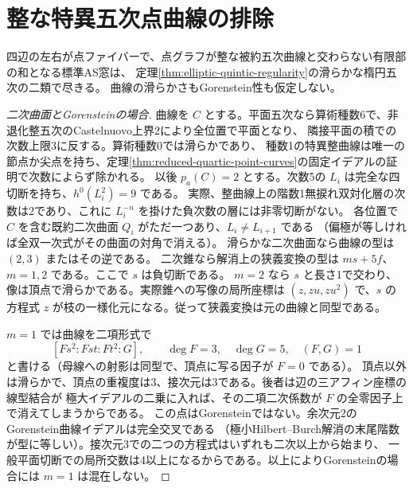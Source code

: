 \section{整な特異五次点曲線の排除}
\label{sec:singular-integral-quintic-exclusion}
\begin{theorem}\label{thm:singular-integral-quintic-exclusion}
四辺の左右が点ファイバーで、点グラフが整な被約五次曲線と交わらない有限部の和となる標準AS窓は、
定理\ref{thm:elliptic-quintic-regularity}の滑らかな楕円五次の二類で尽きる。
曲線の滑らかさもGorenstein性も仮定しない。
\end{theorem}
\begin{proof}[二次曲面とGorensteinの場合]
曲線を $C$ とする。平面五次なら算術種数6で、非退化整五次のCastelnuovo上界2により全位置で平面となり、
隣接平面の積での次数上限3に反する。算術種数0では滑らかであり、
種数1の特異整曲線は唯一の節点か尖点を持ち、定理\ref{thm:reduced-quartic-point-curves}の固定イデアルの証明で次数によらず除かれる。
以後 $p_a(C)=2$ とする。次数5の $L_i$ は完全な四切断を持ち、$h^0(L_i^2)=9$ である。
実際、整曲線上の階数1無捩れ双対化層の次数は2であり、これに $L_i^{-n}$ を掛けた負次数の層には非零切断がない。
各位置で $C$ を含む既約二次曲面 $Q_i$ がただ一つあり、$L_i\ne L_{i+1}$ である
（偏極が等しければ全双一次式がその曲面の対角で消える）。
滑らかな二次曲面なら曲線の型は $(2,3)$ またはその逆である。
二次錐なら解消上の狭義変換の型は $m s+5f$、$m=1,2$ である。ここで $s$ は負切断である。
$m=2$ なら $s$ と長さ1で交わり、像は頂点で滑らかである。実際錐への写像の局所座標は
$(z,zu,zu^2)$ で、$s$ の方程式 $z$ が枝の一様化元になる。従って狭義変換は元の曲線と同型である。

$m=1$ では曲線を二項形式で
\[
 [Fs^2:Fst:Ft^2:G],\qquad \deg F=3,\quad\deg G=5,\quad (F,G)=1
\]
と書ける（母線への射影は同型で、頂点に写る因子が $F=0$ である）。
頂点以外は滑らかで、頂点の重複度は3、接次元は3である。後者は辺の三アフィン座標の線型結合が
極大イデアルの二乗に入れば、その二項二次係数が $F$ の全零因子上で消えてしまうからである。
この点はGorensteinではない。余次元2のGorenstein曲線イデアルは完全交叉である
（極小Hilbert--Burch解消の末尾階数が型に等しい）。接次元3での二つの方程式はいずれも二次以上から始まり、
一般平面切断での局所交数は4以上になるからである。以上によりGorensteinの場合には $m=1$ は混在しない。


\end{proof}
